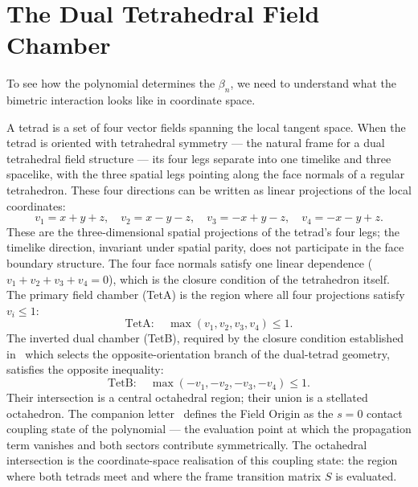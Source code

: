 \documentclass[a4paper,11pt]{article}
\begin{document}
\section{The Dual Tetrahedral Field Chamber}

To see how the polynomial determines the $\beta_n$, we
need to understand what the bimetric interaction looks
like in coordinate space.

A tetrad is a set of four vector fields spanning the
local tangent space. When the tetrad is oriented with
tetrahedral symmetry --- the natural frame for a dual
tetrahedral field structure --- its four legs separate
into one timelike and three spacelike, with the three
spatial legs pointing along the face normals of a
regular tetrahedron.
These four directions can be written as linear projections
of the local coordinates:
\begin{equation}
  v_1 = x+y+z,\quad v_2 = x-y-z,\quad
  v_3 = -x+y-z,\quad v_4 = -x-y+z.
\end{equation}
These are the three-dimensional spatial projections of
the tetrad's four legs; the timelike direction, invariant
under spatial parity, does not participate in the face
boundary structure. The four face normals satisfy one
linear dependence ($v_1 + v_2 + v_3 + v_4 = 0$), which
is the closure condition of the tetrahedron itself.
The primary field chamber (TetA) is the region where all
four projections satisfy $v_i \leq 1$:
\begin{equation}
  \mathrm{TetA}:\quad \max(v_1, v_2, v_3, v_4) \leq 1.
\end{equation}
The inverted dual chamber (TetB), required by the
closure condition established in~\cite{Nelson2026a} which
selects the opposite-orientation branch of the dual-tetrad
geometry, satisfies the opposite inequality:
\begin{equation}
  \mathrm{TetB}:\quad \max(-v_1,-v_2,-v_3,-v_4) \leq 1.
\end{equation}
Their intersection is a central octahedral region; their
union is a stellated octahedron. The companion
letter~\cite{Nelson2026a} defines the Field Origin as the
$s = 0$ contact coupling state of the polynomial --- the
evaluation point at which the propagation term vanishes and
both sectors contribute symmetrically. The octahedral
intersection is the coordinate-space realisation of this
coupling state: the region where both tetrads meet and
where the frame transition matrix $S$ is evaluated.
\end{document}
